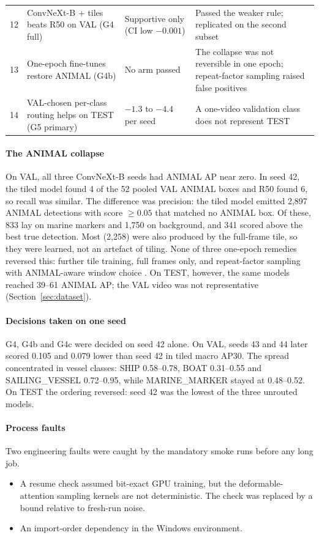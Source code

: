 \begin{table}[t]
\begin{tabular}{rp{4.0cm}p{2.8cm}p{4.9cm}}
12 & ConvNeXt-B + tiles beats R50 on VAL (G4 full) & Supportive only (CI low $-0.001$) & Passed the weaker rule; replicated on the second subset \\
13 & One-epoch fine-tunes restore ANIMAL (G4b) & No arm passed & The collapse was not reversible in one epoch; repeat-factor sampling raised false positives \\
14 & VAL-chosen per-class routing helps on TEST (G5 primary) & $-1.3$ to $-4.4$ per seed & A one-video validation class does not represent TEST \\
\bottomrule
\end{tabular}
\end{table}

\paragraph{The ANIMAL collapse}
On VAL, all three ConvNeXt-B seeds had ANIMAL AP near zero. In seed 42, the tiled model found 4 of the 52 pooled VAL ANIMAL boxes and R50 found 6, so recall was similar. The difference was precision: the tiled model emitted 2{,}897 ANIMAL detections with score $\geq 0.05$ that matched no ANIMAL box. Of these, 833 lay on marine markers and 1{,}750 on background, and 341 scored above the best true detection. Most (2{,}258) were also produced by the full-frame tile, so they were learned, not an artefact of tiling. None of three one-epoch remedies reversed this: further tile training, full frames only, and repeat-factor sampling with ANIMAL-aware window choice \citep{gupta2019lvis}. On TEST, however, the same models reached 39--61 ANIMAL AP; the VAL video was not representative (Section~\ref{sec:dataset}).

\paragraph{Decisions taken on one seed}
G4, G4b and G4c were decided on seed 42 alone. On VAL, seeds 43 and 44 later scored 0.105 and 0.079 lower than seed 42 in tiled macro AP30. The spread concentrated in vessel classes: SHIP 0.58--0.78, BOAT 0.31--0.55 and SAILING\_VESSEL 0.72--0.95, while MARINE\_MARKER stayed at 0.48--0.52. On TEST the ordering reversed: seed 42 was the lowest of the three unrouted models.

\paragraph{Process faults}
Two engineering faults were caught by the mandatory smoke runs before any long job.
\begin{itemize}
\item A resume check assumed bit-exact GPU training, but the deformable-attention sampling kernels are not deterministic. The check was replaced by a bound relative to fresh-run noise.
\item An import-order dependency in the Windows environment.
\end{itemize}
